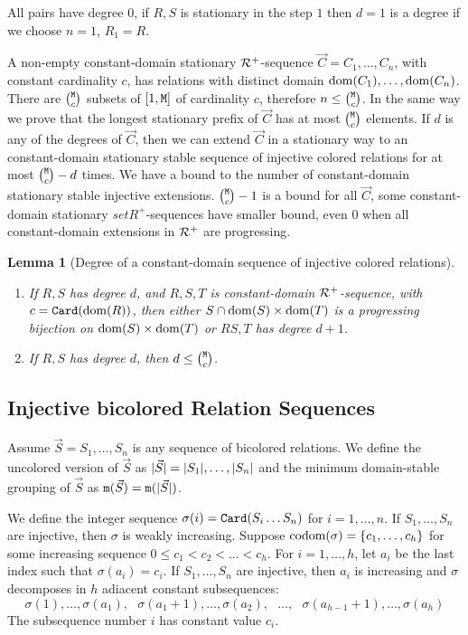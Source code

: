 \documentclass{lmcs}
\newtheorem{lemma}[theorem]{Lemma}
\begin{document}
All pairs have degree $0$, if $R,S$ is stationary in the step $1$ then $d=1$ is a degree
if we choose $n=1$, $R_1 = R$.

A non-empty constant-domain stationary ${\mathcal R}^+$-sequence $\vec{C}=C_1, \ldots, C_n$, 
with constant cardinality $c$,
has relations with distinct domain ${\rm dom}(C_1), \ldots, {\rm dom}(C_n)$. There are 
$\newton{\MaxInd}{c}$ subsets of $[1,{\tt M}]$
of cardinality $c$, therefore $n \le \newton{\MaxInd}{c}$. In the same way
we prove that the longest stationary prefix of $\vec{C}$ has at most
$\newton{\MaxInd}{c}$ elements. If $d$ is any of the degrees of
$\vec{C}$, then we can extend $\vec{C}$ in a stationary way to 
an constant-domain stationary stable sequence of injective colored relations for at most
$\newton{\MaxInd}{c}-d$ times. We have a bound to the
number of constant-domain stationary stable injective extensions. $\newton{\MaxInd}{c}-1$
is a bound for all $\vec{C}$, some constant-domain stationary $setR^+$-sequences
have smaller bound, even $0$ when all constant-domain extensions in ${\mathcal R}^+$
are progressing.

\begin{lemma}[Degree of a constant-domain sequence of injective colored relations]
\label{lemma-degree-constant}
\begin{enumerate}

\item
If $R,S$ has degree $d$,
and $R,S,T$ is constant-domain ${\mathcal R}^+$-sequence, with $c = {\tt Card}({\rm dom}(R))$, then either 
$S \cap {\rm dom}(S) \times {\rm dom}(T)$ is a progressing bijection on ${\rm dom}(S) \times {\rm dom}(T)$
or $RS, T$ has degree $d+1$.

\item
If $R,S$ has degree $d$, then $d \le \newton{\MaxInd}{c}$.
\end{enumerate}
\end{lemma}



\subsection{Injective bicolored Relation Sequences}

Assume $\vec{S} = S_1, \ldots, S_n$ is any sequence of bicolored relations. We define
the uncolored version of $\vec{S}$ as ${| \vec{S} |} = {| S_1 |}, \ldots, 
{| S_n |}$ and the minimum domain-stable grouping of $\vec{S}$ as
${\tt m}(\vec{S}) = {\tt m}({| \vec{S} |})$.

We define the integer sequence $\sigma(i) = {\tt Card}(S_i \ldots S_n)$ for $i=1, \ldots, n$.
If $S_1, \ldots, S_n$ are injective,  then $\sigma$ is weakly increasing.
Suppose ${\rm codom}(\sigma) = \{c_1, \ldots, c_h\}$ for some increasing sequence 
$0 \le c_1 < c_2 < \ldots < c_h$. For $i=1, \ldots, h$, let $a_i$ be the last index such that
$ \sigma(a_i) = c_i$. If $S_1, \ldots, S_n$ are injective, then $a_i$ is increasing
and $\sigma$ decomposes in $h$ adiacent constant subsequences:
$$
\sigma(1), \ldots, \sigma(a_1),
\ \ \
\sigma(a_1+1), \ldots, \sigma(a_2),
\ \ \ 
\ldots,
\ \ \
\sigma(a_{h-1}+1), \ldots, \sigma(a_h)
$$ 
The subsequence number $i$ has constant value $c_i$.
\end{document}
